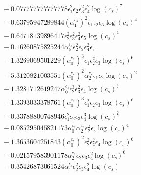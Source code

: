 \documentclass[10pt]{article}
\begin{document}
\begin{align*}
&{}  - 0.077777777777778 \epsilon_{1}^{2} \epsilon_{2} \epsilon_{3}^{2} \epsilon_{4}^{2} \log{\left(c_{s} \right)}^{7} \\
&{}  - 0.63795947289844 \left(\alpha_{1}^{c_s}\right)^{2} \epsilon_{1} \epsilon_{2} \epsilon_{3} \log{\left(c_{s} \right)}^{4} \\
&{}  - 0.64718139896417 \epsilon_{2}^{2} \epsilon_{3}^{2} \epsilon_{4}^{2} \epsilon_{5} \log{\left(c_{s} \right)}^{4} \\
&{}  - 0.16260875825244 \alpha_{0}^{c_s} \epsilon_{2}^{2} \epsilon_{3} \epsilon_{4}^{2} \epsilon_{5} \\
&{}  - 1.3269069501229 \left(\alpha_{0}^{c_s}\right)^{3} \epsilon_{1} \epsilon_{2}^{2} \epsilon_{3} \log{\left(c_{s} \right)}^{6} \\
&{}  - 5.3120821003551 \left(\alpha_{0}^{c_s}\right)^{2} \alpha_{2}^{c_s} \epsilon_{1} \epsilon_{2} \log{\left(c_{s} \right)}^{2} \\
&{}  - 1.3281712619247 \alpha_{0}^{c_s} \epsilon_{2}^{3} \epsilon_{3}^{2} \epsilon_{4} \log{\left(c_{s} \right)}^{6} \\
&{}  - 1.3393033378761 \left(\alpha_{0}^{c_s}\right)^{3} \epsilon_{1}^{2} \epsilon_{2} \epsilon_{3} \log{\left(c_{s} \right)}^{6} \\
&{}  - 0.33788800748946 \epsilon_{1}^{2} \epsilon_{2} \epsilon_{3} \epsilon_{4}^{3} \log{\left(c_{s} \right)}^{2} \\
&{}  - 0.085295045821173 \alpha_{0}^{c_s} \alpha_{2}^{c_s} \epsilon_{2}^{2} \epsilon_{3} \log{\left(c_{s} \right)}^{4} \\
&{}  - 1.3653604251843 \left(\alpha_{0}^{c_s}\right)^{2} \epsilon_{2}^{2} \epsilon_{3}^{2} \epsilon_{4} \log{\left(c_{s} \right)}^{6} \\
&{}  - 0.021579583901178 \alpha_{2}^{c_s} \epsilon_{2} \epsilon_{3} \epsilon_{4}^{2} \log{\left(c_{s} \right)}^{6} \\
&{}  - 0.35426873061524 \alpha_{1}^{c_s} \epsilon_{2}^{2} \epsilon_{3} \epsilon_{4}^{2} \log{\left(c_{s} \right)}
\end{align*}
\end{document}
